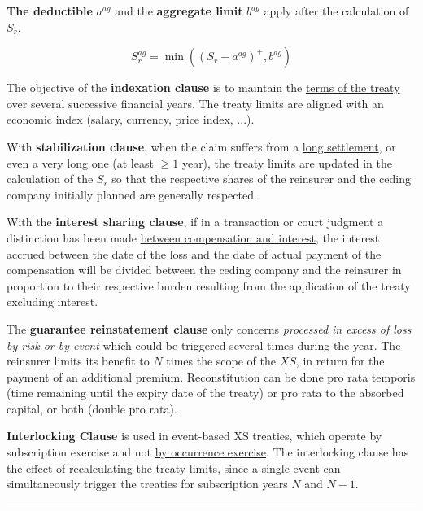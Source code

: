 \begin{f}

\textbf{The deductible} \(a^{ag}\) and the \textbf{aggregate limit} \(b^{ag}\) apply after the calculation of \(S_r\).

\[
S_r^{ag} = \min\left( \left(S_r - a^{ag}  \right)^+,b^{ag}\right)  
\]
\medskip

The objective of the \textbf{indexation clause} is to maintain the \underline{terms of the treaty} over several successive financial years. The treaty limits are aligned with an economic index (salary, currency, price index, ...).
\medskip

With \textbf{stabilization clause}, when the claim suffers from a \underline{long settlement}, or even a very long one (at least \(\geq 1\) year), the treaty limits are updated in the calculation of the \(S_r\) so that the respective shares of the reinsurer and the ceding company initially planned are generally respected.
\medskip
	

With the \textbf{interest sharing clause}, if in a transaction or court judgment a distinction has been made \underline{between compensation and interest}, the interest accrued between the date of the loss and the date of actual payment of the compensation will be divided between the ceding company and the reinsurer in proportion to their respective burden resulting from the application of the treaty excluding interest.


\medskip


The \textbf{guarantee reinstatement clause}
only concerns \emph{processed in excess of loss by risk or by event} which could be triggered several times during the year.
The reinsurer limits its benefit to \(N\) times the scope of the \(XS\), in return for the payment of an additional premium.
Reconstitution can be done pro rata temporis (time remaining until the expiry date of the treaty) or pro rata to the absorbed capital, or both (double pro rata).




\textbf{Interlocking Clause} is used in event-based XS treaties, which operate by subscription exercise and not \underline{by occurrence exercise}.
The interlocking clause has the effect of recalculating the treaty limits, since a single event can simultaneously trigger the treaties for subscription years \(N\) and \(N-1\).

\end{f}
\hrule

